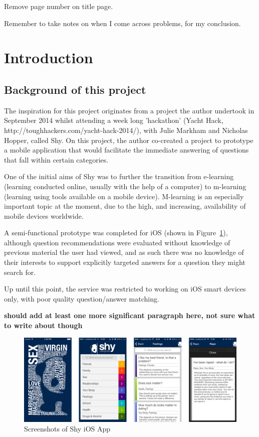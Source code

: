 \documentclass{article}
\begin{document}
Remove page number on title page.



Remember to take notes on when I come across problems, for my conclusion.

\section{Introduction}

\subsection{Background of this project}

The inspiration for this project originates from a project the author undertook in September 2014 whilst attending a week long 'hackathon' (Yacht Hack, http://toughhackers.com/yacht-hack-2014/), with Julie Markham and Nicholas Hopper, called Shy.  On this project, the author co-created a project to prototype a mobile application that would facilitate the immediate answering of questions that fall within certain categories.

One of the initial aims of Shy was to further the transition from e-learning (learning conducted online, usually with the help of a computer) to m-learning (learning using tools available on a mobile device).  M-learning is an especially important topic at the moment, due to the high, and increasing, availability of mobile devices worldwide.

A semi-functional prototype was completed for iOS (shown in Figure~\ref{fig:shy-ios-screenshots}), although question recommendations were evaluated without knowledge of previous material the user had viewed, and as such there was no knowledge of their interests to support explicitly targeted answers for a question they might search for.

Up until this point, the service was restricted to working on iOS smart devices only, with poor quality question/answer matching.

{\bf should add at least one more significant paragraph here, not sure what to write about though}

\begin{figure}[htb] 
\includegraphics[width=\linewidth]{shy-screenshots}
\caption{Screenshots of Shy iOS App}
\label{fig:shy-ios-screenshots}
\end{figure}
\end{document}
